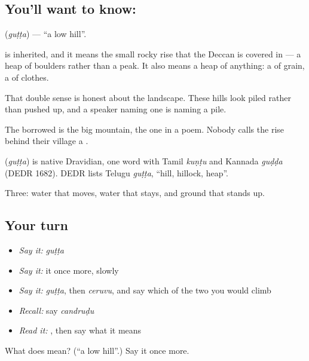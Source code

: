 \subsection*{You'll want to know: }
\textbf{} (\emph{guṭṭa}) — \textquotedblleft{}a low hill\textquotedblright{}.

 is inherited, and it means the small rocky rise that the Deccan is covered in — a heap of boulders rather than a peak. It also means a heap of anything: a  of grain, a  of clothes.

That double sense is honest about the landscape. These hills look piled rather than pushed up, and a speaker naming one is naming a pile.

The borrowed  is the big mountain, the one in a poem. Nobody calls the rise behind their village a .

\begin{cousinweb}
\textbf{} (\emph{guṭṭa}) is native Dravidian, one word with Tamil \emph{kuṇṭu} and Kannada \emph{guḍḍa} (DEDR 1682). DEDR lists Telugu \emph{guṭṭa}, \textquotedblleft{}hill, hillock, heap\textquotedblright{}.
\end{cousinweb}

\begin{grammarlens}[title={What you've built}]
Three: water that moves, water that stays, and ground that stands up.
\end{grammarlens}

\subsection*{Your turn}
\begin{itemize}
\raggedright
  \item \emph{Say it:} \emph{guṭṭa}
  \item \emph{Say it:} it once more, slowly
  \item \emph{Say it:} \emph{guṭṭa}, then \emph{ceruvu}, and say which of the two you would climb
  \item \emph{Recall:} say \emph{candruḍu}
  \item \emph{Read it:} \textbf{}, then say what it means
\end{itemize}

\begin{tcolorbox}[breakable,colback=teal!4,colframe=teal!35!black,title={Before you move on}]
What does  mean? (\textquotedblleft{}a low hill\textquotedblright{}.) Say it once more.
\end{tcolorbox}
